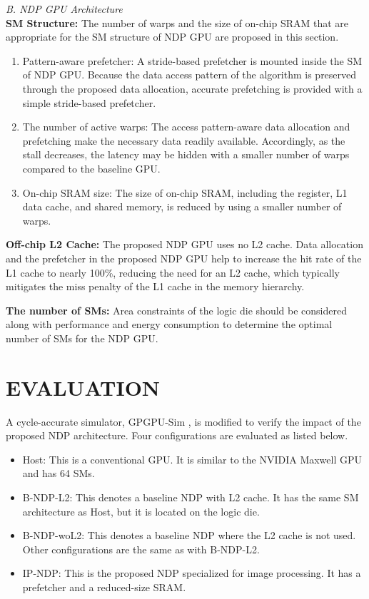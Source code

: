 \documentclass[onecolumn]{article}
\begin{document}
\textit{B. NDP GPU Architecture}\\
\textbf{SM Structure:} The number of warps and the size of on-chip SRAM that are appropriate for the SM structure of NDP GPU are proposed in this section.

\begin{enumerate}[label=(\arabic*)]
	\item Pattern-aware prefetcher: A stride-based prefetcher is mounted inside the SM of NDP GPU. Because the data access pattern of the algorithm is preserved through the proposed data allocation, accurate prefetching is provided with a simple stride-based prefetcher.
	\item The number of active warps: The access pattern-aware data allocation and prefetching make the necessary data readily available. Accordingly, as the stall decreases, the latency may be hidden with a smaller number of warps compared to the baseline GPU.
	\item On-chip SRAM size: The size of on-chip SRAM, including the register, L1 data cache, and shared memory, is reduced by using a smaller number of warps.
\end{enumerate}

\textbf{Off-chip L2 Cache:} The proposed NDP GPU uses no L2 cache. Data allocation and the prefetcher in the proposed NDP GPU help to increase the hit rate of the L1 cache to nearly 100\%, reducing the need for an L2 cache, which typically mitigates the miss penalty of the L1 cache in the memory hierarchy.

\textbf{The number of SMs:} Area constraints of the logic die should be considered along with performance and energy consumption to determine the optimal number of SMs for the NDP GPU.

\section{EVALUATION}

A cycle-accurate simulator, GPGPU-Sim \cite{ref4}, is modified to verify the impact of the proposed NDP architecture. Four configurations are evaluated as listed below.

\begin{itemize}
	\item Host: This is a conventional GPU. It is similar to the NVIDIA Maxwell GPU \cite{ref5} and has 64 SMs.
	\item B-NDP-L2: This denotes a baseline NDP with L2 cache. It has the same SM architecture as Host, but it is located on the logic die.
	\item B-NDP-woL2: This denotes a baseline NDP where the L2 cache is not used. Other configurations are the same as with B-NDP-L2.
	\item IP-NDP: This is the proposed NDP specialized for image processing. It has a prefetcher and a reduced-size SRAM.
\end{itemize}
\end{document}
